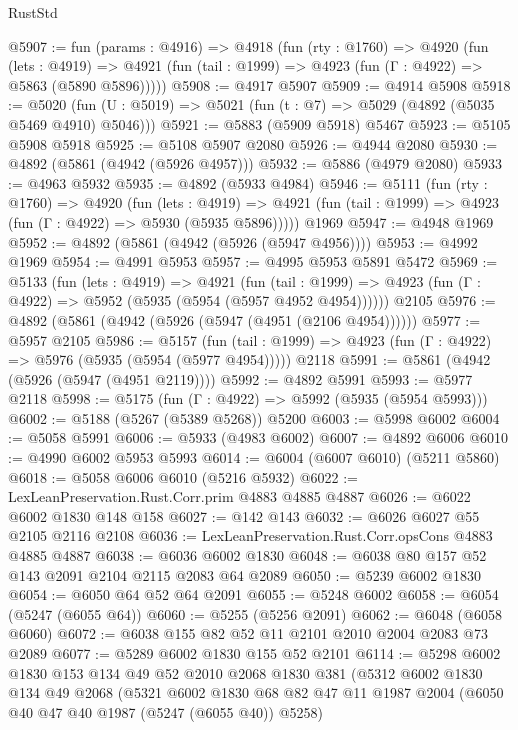 \begin{lexlean}{RustStd}
\begin{coremodule}
@5907 := fun (params : @4916) =>
  @4918
    (fun (rty : @1760) =>
    @4920
      (fun (lets : @4919) =>
      @4921 (fun (tail : @1999) => @4923 (fun (Γ : @4922) => @5863 (@5890 @5896)))))
@5908 := @4917 @5907
@5909 := @4914 @5908
@5918 := @5020 (fun (U : @5019) => @5021 (fun (t : @7) => @5029 (@4892 (@5035 @5469 @4910) @5046)))
@5921 := @5883 (@5909 @5918) @5467
@5923 := @5105 @5908 @5918
@5925 := @5108 @5907 @2080
@5926 := @4944 @2080
@5930 := @4892 (@5861 (@4942 (@5926 @4957)))
@5932 := @5886 (@4979 @2080)
@5933 := @4963 @5932
@5935 := @4892 (@5933 @4984)
@5946 := @5111
    (fun (rty : @1760) =>
    @4920
      (fun (lets : @4919) =>
      @4921 (fun (tail : @1999) => @4923 (fun (Γ : @4922) => @5930 (@5935 @5896)))))
    @1969
@5947 := @4948 @1969
@5952 := @4892 (@5861 (@4942 (@5926 (@5947 @4956))))
@5953 := @4992 @1969
@5954 := @4991 @5953
@5957 := @4995 @5953 @5891 @5472
@5969 := @5133
    (fun (lets : @4919) =>
    @4921
      (fun (tail : @1999) => @4923 (fun (Γ : @4922) => @5952 (@5935 (@5954 (@5957 @4952 @4954))))))
    @2105
@5976 := @4892 (@5861 (@4942 (@5926 (@5947 (@4951 (@2106 @4954))))))
@5977 := @5957 @2105
@5986 := @5157
    (fun (tail : @1999) => @4923 (fun (Γ : @4922) => @5976 (@5935 (@5954 (@5977 @4954)))))
    @2118
@5991 := @5861 (@4942 (@5926 (@5947 (@4951 @2119))))
@5992 := @4892 @5991
@5993 := @5977 @2118
@5998 := @5175 (fun (Γ : @4922) => @5992 (@5935 (@5954 @5993)))
@6002 := @5188 (@5267 (@5389 @5268)) @5200
@6003 := @5998 @6002
@6004 := @5058 @5991
@6006 := @5933 (@4983 @6002)
@6007 := @4892 @6006
@6010 := @4990 @6002 @5953 @5993
@6014 := @6004 (@6007 @6010) (@5211 @5860)
@6018 := @5058 @6006 @6010 (@5216 @5932)
@6022 := LexLeanPreservation.Rust.Corr.prim @4883 @4885 @4887
@6026 := @6022 @6002 @1830 @148 @158
@6027 := @142 @143
@6032 := @6026 @6027 @55 @2105 @2116 @2108
@6036 := LexLeanPreservation.Rust.Corr.opsCons @4883 @4885 @4887
@6038 := @6036 @6002 @1830
@6048 := @6038 @80 @157 @52 @143 @2091 @2104 @2115 @2083 @64 @2089
@6050 := @5239 @6002 @1830
@6054 := @6050 @64 @52 @64 @2091
@6055 := @5248 @6002
@6058 := @6054 (@5247 (@6055 @64))
@6060 := @5255 (@5256 @2091)
@6062 := @6048 (@6058 @6060)
@6072 := @6038 @155 @82 @52 @11 @2101 @2010 @2004 @2083 @73 @2089
@6077 := @5289 @6002 @1830 @155 @52 @2101
@6114 := @5298
    @6002
    @1830
    @153
    @134
    @49
    @52
    @2010
    @2068
    @1830
    @381
    (@5312
      @6002
      @1830
      @134
      @49
      @2068
      (@5321
        @6002
        @1830
        @68
        @82
        @47
        @11
        @1987
        @2004
        (@6050 @40 @47 @40 @1987 (@5247 (@6055 @40)) @5258)

\end{coremodule}
\end{lexlean}
